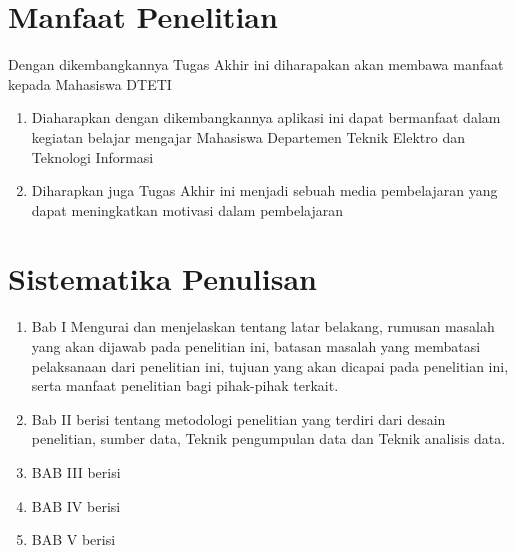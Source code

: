 \section{Manfaat Penelitian}
Dengan dikembangkannya Tugas Akhir ini diharapakan akan membawa manfaat kepada Mahasiswa DTETI

\begin{enumerate}
	\item Diaharapkan dengan dikembangkannya aplikasi ini dapat bermanfaat dalam kegiatan belajar mengajar Mahasiswa Departemen Teknik Elektro dan Teknologi Informasi 
	\item Diharapkan juga Tugas Akhir ini menjadi sebuah media pembelajaran yang dapat meningkatkan motivasi dalam pembelajaran
\end{enumerate}

\section{Sistematika Penulisan}
\begin{enumerate}
	\item Bab I Mengurai dan menjelaskan tentang latar belakang, rumusan 
	masalah yang akan dijawab pada penelitian ini, batasan masalah yang membatasi 
	pelaksanaan dari penelitian ini, tujuan yang akan dicapai pada penelitian ini, serta manfaat 
	penelitian bagi pihak-pihak terkait.
	
	\item Bab II berisi tentang metodologi penelitian yang terdiri dari desain penelitian, sumber data, Teknik pengumpulan data dan Teknik analisis data.
	\item BAB III berisi
	\item BAB IV berisi
	\item BAB V berisi
\end{enumerate}

